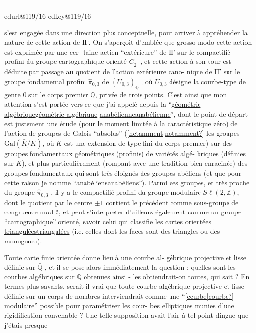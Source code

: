 \documentclass[11pt,a4paper]{article}
\makeatletter
\newif\ifdiplomatic
\newif\ifreading
\def\CurrentScanURL{}
\def\CurrentPageKey{}
\def\CurrentApparatus{}
\newcounter{appnote}
\newcommand{\scanpage}[1]{%
  \clearpage
  \expandafter\let\expandafter\CurrentScanURL\csname edurl@#1\endcsname
  \expandafter\let\expandafter\CurrentPageKey\csname edkey@#1\endcsname
  \def\CurrentApparatus{}%
  \hypertarget{scan-\CurrentPageKey}{}%
  \typeout{EDITION-SCAN: \CurrentPageKey; PDFPAGE: \the\numexpr\ReadonlyShipoutCounter+1\relax}%
  \ifreading
    \marginnote{\raggedright\scriptsize\sffamily\href{\CurrentScanURL}{119 / \csname edpage@#1\endcsname}}%
  \else
    \noindent{\small\sffamily\href{\CurrentScanURL}{[scan #1]}}\par\smallskip
  \fi}
\newcommand{\mspage}[1]{%
  \ifreading\marginnote{\raggedright\scriptsize\sffamily p.\,#1}[2\baselineskip]%
  \else\noindent{\small\sffamily[p.\,#1]}\par\smallskip\fi}
\let\TextUline\uline
\renewcommand{\uline}[1]{\ifmmode\underline{#1}\else\TextUline{#1}\fi}
\newcommand{\unsure}[1]{\href{\CurrentScanURL}{[#1?]}}
\newcommand{\AppItem}[2]{%
  \ifcsdef{edvariant@#2}{%
    \ifcsempty{edvariant@#2}{\PackageError{Esquisse}{Empty apparatus entry #2}{Every executed apparatus marker requires its printed note.}}{}%
  }{\PackageError{Esquisse}{Undefined apparatus entry #2}{Every executed apparatus marker requires its printed note.}}%
  \typeout{EDITION-APP-ENTRY: #2; NUMBER: #1}%
  \par\noindent\textsuperscript{#1}\csname edvariant@#2\endcsname}
\newcommand{\EditionApp}[1]{%
  \stepcounter{appnote}%
  \ifmmode{}^{\scriptscriptstyle\theappnote}\else\textsuperscript{\theappnote}\fi
  \begingroup\edef\x{\endgroup\noexpand\gappto\noexpand\CurrentApparatus{\noexpand\AppItem{\theappnote}{#1}}}\x}
\newcommand{\var}[4]{\ifdiplomatic#1\else#2\ifreading\else\EditionApp{#4}\fi\fi}
\newcommand{\finishscan}{\ifx\CurrentApparatus\empty\else\par\bigskip\noindent\rule{.35\linewidth}{.35pt}\par\smallskip{\footnotesize\setlength{\parskip}{3pt}\CurrentApparatus}\fi}
\makeatother
\begin{document}
\finishscan
\scanpage{119/16}
\mspage{14}

s'est engagée dans \var{une directions}{une direction}{slip corrected}{V-FR-016-001} plus conceptuelle, pour arriver
à appréhender la nature de cette action de $\mathrm{I\!\Gamma}$. On s'aperçoit
d'emblée que grosso-modo cette action est exprimée par une cer-%
taine action ``extérieure'' de $\mathrm{I\!\Gamma}$ sur le compactifié profini du
groupe cartographique orienté $\underline{C}_2^{+}$ , et cette action à son tour
est déduite par passage au quotient de l'action extérieure cano-%
nique de $\mathrm{I\!\Gamma}$ sur le groupe fondamental profini $\hat{\pi}_{0,3}$ de $(U_{0,3})_{\bar{\mathbb{Q}}}$ ,
où $U_{0,3}$ désigne la courbe-type de genre $0$ sur le corps premier
$\mathbb{Q}$, privée de trois points. C'est ainsi que mon attention s'est
portée vers ce que j'ai appelé depuis la ``\uline{géométrie algébrique}
\uline{anabélienne}'', dont le point de départ est justement une étude
(pour le moment limitée à la caractéristique zéro) de l'action
de groupes de Galois ``absolus'' (\unsure{nctamment|notamment} les groupes $\mathrm{Gal}(\bar{K}/K)$,
où $K$ est une extension de type fini du corps premier) sur des
groupes fondamentaux géométriques (profinis) de variétés algé-%
briques (définies sur $K$), et plus particulièrement (rompant avec
une tradition bien enracinée) des groupes fondamentaux qui sont
très éloignés des groupes abéliens (et que pour cette raison je
nomme ``\uline{anabéliens}''). Parmi ces groupes, et très proche du groupe
$\hat{\pi}_{0,3}$ , il y a le compactifié profini du groupe modulaire $S\ell(2,\mathbb{Z})$,
dont le quotient par le centre $\pm 1$ contient le précédent comme
sous-groupe de congruence mod 2, et peut s'interpréter d'ailleurs
également comme un groupe ``cartographique'' orienté, savoir celui
qui classifie les cartes orientées \uline{triangulées} (i.e. celles dont
les faces sont des triangles ou des monogones).

Toute carte finie orientée donne lieu à une courbe al-%
gébrique projective et lisse définie sur $\bar{\mathbb{Q}}$ , et il se pose alors
immédiatement la question : quelles sont les courbes algébriques
sur $\bar{\mathbb{Q}}$ obtenues ainsi - les obtiendrait-on toutes, qui sait ?
En termes plus savants, serait-il vrai que toute courbe algébrique
projective et lisse définie sur un corps de nombres interviendrait
comme une ``\unsure{ccurbe|courbe} modulaire'' possible pour paramétriser les cour-%
bes elliptiques munies d'une rigidification convenable ? Une telle
supposition avait l'air à tel point dingue que j'étais presque
\end{document}
